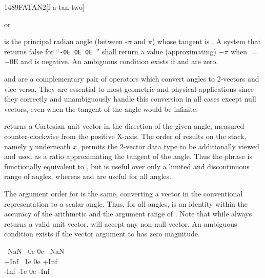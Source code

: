 \begin{worddef}{1489}{FATAN2}[f-a-tan-two]
\item {} or

	 is the principal radian angle (between -$\pi$ and $\pi$)
	whose tangent is .
	A system that returns false for ``\texttt{-0E 0E 0E }''
	shall return a value (approximating) $-\pi$ when  $=$ $-0$E
	and  is negative.
	An ambiguous condition exists if  and  are
	zero.

	\begin{rationale} %
		 and  are a complementary pair of
		operators which convert angles to 2-vectors and vice-versa.
		They are essential to most geometric and physical applications
		since they correctly and unambiguously handle this conversion
		in all cases except null vectors, even when the tangent of the
		angle would be infinite.

		 returns a Cartesian unit vector in the direction
		of the given angle, measured counter-clockwise from the positive
		X-axis. The order of results on the stack, namely $y$ underneath
		$x$, permits the 2-vector data type to be additionally viewed
		and used as a ratio approximating the tangent of the angle.
		Thus the phrase   is functionally
		equivalent to , but is useful over only a limited
		and discontinuous range of angles, whereas  and
		 are useful for all angles.

		The argument order for  is the same, converting a
		vector in the conventional representation to a scalar angle.
		Thus, for all angles,   is an identity
		within the accuracy of the arithmetic and the argument range of
		. Note that while  always returns a
		valid unit vector,  will accept any non-null vector.
		An ambiguous condition exists if the vector argument to
		 has zero magnitude.
	\end{rationale}

	\begin{testing} %
		\ttfamily
		\word[tools]{[UNDEFINED]} ~NaN \word[tools]{[IF]} ~0e 0e   ~NaN \word[tools]{[THEN]} \\
		\word[tools]{[UNDEFINED]} +Inf \word[tools]{[IF]} ~1e 0e   +Inf \word[tools]{[THEN]} \\
		\word[tools]{[UNDEFINED]} -Inf \word[tools]{[IF]} -1e 0e   -Inf \word[tools]{[THEN]}


\end{testing}
\end{worddef}
